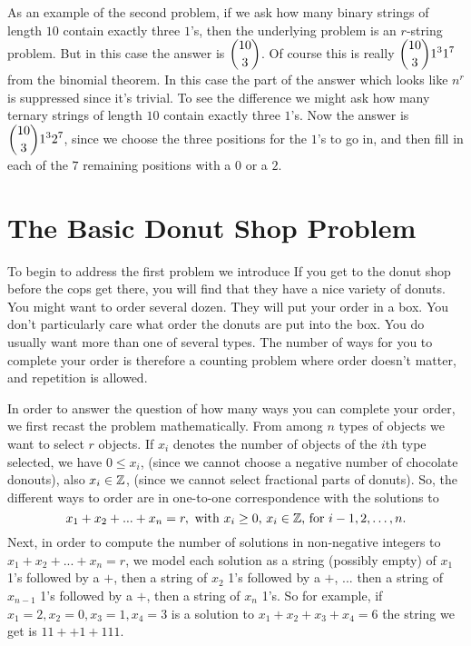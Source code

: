 \begin{exmp}
 As an example of the second problem, if we ask how many binary strings of length $10$ contain
 exactly three $1$'s, then the underlying problem is an $r$-string problem. But in this case
 the answer is $\displaystyle{{10\choose 3}}$. Of course this is really $\displaystyle{{10\choose 3}1^31^7}$ from
 the binomial theorem. In this case the part of the answer which looks like $n^r$ is suppressed
 since it's trivial. To see the difference we might ask how many ternary strings of length $10$
 contain exactly three $1$'s. Now the answer is $\displaystyle{{10\choose 3} 1^3 2^7}$, since we choose
 the three positions for the $1$'s to go in, and then fill in each of the $7$ remaining positions with a $0$ or a $2$.
\end{exmp}



\section{The Basic Donut Shop Problem}\label{sect:basic donut shop problem}
To begin to address the first problem we introduce
If you get to the donut shop before the cops get there,
you will find that they have a nice variety of donuts. You might want to order several dozen.
They will put your order in a box. You don't particularly care what order the donuts are put into
the box. You do usually want more than one of several types. The number of ways for you to
complete your order is therefore a counting problem where order doesn't matter, and repetition
is allowed.

In order to answer the question of how many ways you can complete your order, we first
recast the problem mathematically. From among $n$ types of objects we want to select 
$r$ objects. If $x_i$ denotes the number of objects of the $i$th type selected, we have
$0\leq x_i$, (since we cannot choose a negative number of chocolate donouts), also
$x_i\in \mathbb{Z}$, (since we cannot select fractional parts of donuts). So, the different ways to order 
are in one-to-one correspondence with the solutions  to
\[
 x_1+x_2+...+x_n=r, \text{ with $x_i \geq 0$, $x_i \in \mathbb{Z}$, for $i-1,2,\dots,n$.}
\]
Next, in order to compute the number of solutions in non-negative integers to $x_1+x_2+...+x_n=r $, 
we model each solution as a string (possibly empty) of $x_1$ 1's followed by a $+$, 
then a string of $x_2$ 1's followed by a $+$, ... then a string of $x_{n-1}$ 1's followed by a $+$, then
a string of $x_n$ 1's. So for example, if $x_1=2, x_2=0, x_3=1, x_4=3$ is a solution to $x_1+x_2+x_3+x_4=6$
the string we get is $11++1+111$. 

